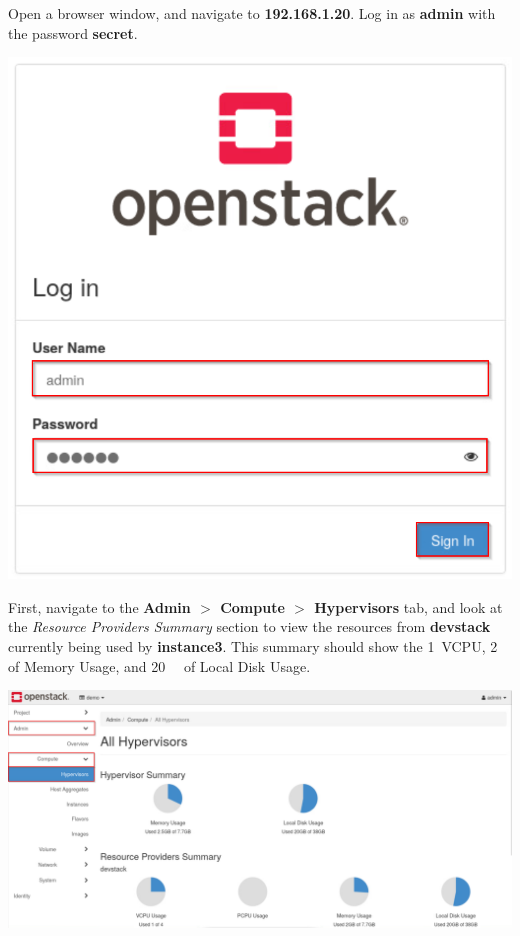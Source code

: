 \documentclass[letterpaper, 12pt]{article}
\begin{document}
\begin{enumerate}
    \begin{labstep}
        Open a browser window, and navigate to \textbf{192.168.1.20}.
        Log in as \textbf{admin} with the password \textbf{secret}.

        \begin{center}
            \includegraphics[scale=0.5]{images/part5/step1.png}
        \end{center}
    \end{labstep}

    \begin{labstep}
        First, navigate to the \textbf{Admin $>$ Compute $>$ Hypervisors} tab, and look at the \textit{Resource Providers Summary} section to view the resources from \textbf{devstack} currently being used by \textbf{instance3}.
        This summary should show the 1~VCPU, \qty{2}{\giga\byte} of Memory Usage, and \qty{20}{\giga\byte} of Local Disk Usage.

        \begin{center}
            \includegraphics[width=\linewidth]{images/part5/step2.png}
        \end{center}
    \end{labstep}


\end{enumerate}
\end{document}
